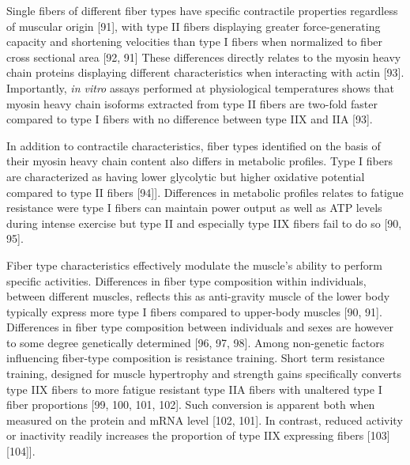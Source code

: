 \documentclass[twoside,10pt]{gihclass} %
\begin{document}
Single fibers of different fiber types have specific contractile properties regardless of muscular origin
{[}91{]},
with type II fibers displaying greater force-generating capacity and shortening velocities than type I fibers when normalized to fiber cross sectional area
{[}92, 91{]}
These differences directly relates to the myosin heavy chain proteins displaying different characteristics when interacting with actin
{[}93{]}.
Importantly, \emph{in vitro} assays performed at physiological temperatures shows that myosin heavy chain isoforms extracted from type II fibers are two-fold faster compared to type I fibers with no difference between type IIX and IIA
{[}93{]}.

In addition to contractile characteristics, fiber types identified on the basis of their myosin heavy chain content also differs in metabolic profiles.
Type I fibers are characterized as having lower glycolytic but higher oxidative potential compared to type II fibers
{[}94{]}{]}.
Differences in metabolic profiles relates to fatigue resistance were type I fibers can maintain power output as well as ATP levels during intense exercise but type II and especially type IIX fibers fail to do so
{[}90, 95{]}.

Fiber type characteristics effectively modulate the muscle's ability to perform specific activities. Differences in fiber type composition within individuals, between different muscles, reflects this as anti-gravity muscle of the lower body typically express more type I fibers compared to upper-body muscles
{[}90, 91{]}.
Differences in fiber type composition between individuals and sexes are however to some degree genetically determined
{[}96, 97, 98{]}.
Among non-genetic factors influencing fiber-type composition is resistance training. Short term resistance training, designed for muscle hypertrophy and strength gains specifically converts type IIX fibers to more fatigue resistant type IIA fibers with unaltered type I fiber proportions
{[}99, 100, 101, 102{]}.
Such conversion is apparent both when measured on the protein and mRNA level
{[}102, 101{]}.
In contrast, reduced activity or inactivity readily increases the proportion of type IIX expressing fibers
{[}103{]}
{[}104{]}{]}.
\end{document}
